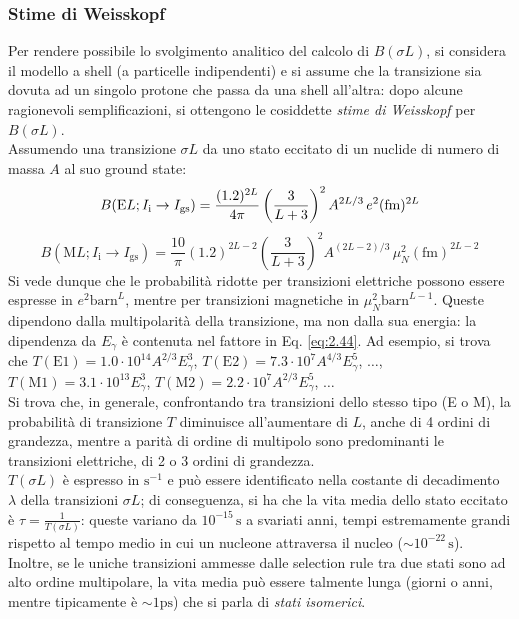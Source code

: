 \subsubsection{Stime di Weisskopf}

Per rendere possibile lo svolgimento analitico del calcolo di $ B(\sigma L) $, si considera il modello a shell (a particelle indipendenti) e si assume che la transizione sia dovuta ad un singolo protone che passa da una shell all'altra: dopo alcune ragionevoli semplificazioni, si ottengono le cosiddette \textit{stime di Weisskopf} per $ B(\sigma L) $.\\
Assumendo una transizione $ \sigma L $ da uno stato eccitato di un nuclide di numero di massa $ A $ al suo ground state:
\begin{equation}
	B(\text{E}L; I_{\text{i}} \rightarrow I_{\text{gs}}) = \frac{(1.2)^{2L}}{4\pi} \left( \frac{3}{L + 3} \right)^2 A^{2L/3} \,e^2 (\text{fm})^{2L}\\
	\label{eq:2.45}
\end{equation}
\begin{equation}
	B(\text{M}L; I_{\text{i}} \rightarrow I_{\text{gs}}) = \frac{10}{\pi} (1.2)^{2L - 2} \left( \frac{3}{L + 3} \right)^2 A^{(2L - 2)/3} \,\mu_N^2 (\text{fm})^{2L - 2}
	\label{eq:2.46}
\end{equation}
Si vede dunque che le probabilità ridotte per transizioni elettriche possono essere espresse in $ e^2 \text{barn}^L $, mentre per transizioni magnetiche in $ \mu_N^2 \text{barn}^{L - 1} $. Queste dipendono dalla multipolarità della transizione, ma non dalla sua energia: la dipendenza da $ E_{\gamma} $ è contenuta nel fattore in Eq. \ref{eq:2.44}. Ad esempio, si trova che $ T(\text{E}1) = 1.0 \cdot 10^{14} A^{2/3} E_{\gamma}^3 $, $ T(\text{E}2) = 7.3 \cdot 10^7 A^{4/3} E_{\gamma}^5 $, $ \dots $, $ T(\text{M}1) = 3.1 \cdot 10^{13} E_{\gamma}^3 $, $ T(\text{M}2) = 2.2 \cdot 10^7 A^{2/3} E_{\gamma}^5 $, $ \dots $\\
Si trova che, in generale, confrontando tra transizioni dello stesso tipo (E o M), la probabilità di transizione $ T $ diminuisce all'aumentare di $ L $, anche di 4 ordini di grandezza, mentre a parità di ordine di multipolo sono predominanti le transizioni elettriche, di 2 o 3 ordini di grandezza.\\
$ T(\sigma L) $ è espresso in $ \text{s}^{-1} $ e può essere identificato nella costante di decadimento $ \lambda $ della transizioni $ \sigma L $; di conseguenza, si ha che la vita media dello stato eccitato è $ \tau = \frac{1}{T(\sigma L)} $: queste variano da $ 10^{-15}\,\text{s} $ a svariati anni, tempi estremamente grandi rispetto al tempo medio in cui un nucleone attraversa il nucleo ($ \sim 10^{-22}\,\text{s} $). Inoltre, se le uniche transizioni ammesse dalle selection rule tra due stati sono ad alto ordine multipolare, la vita media può essere talmente lunga (giorni o anni, mentre tipicamente è $ \sim 1\text{ps} $) che si parla di \textit{stati isomerici}.\\
